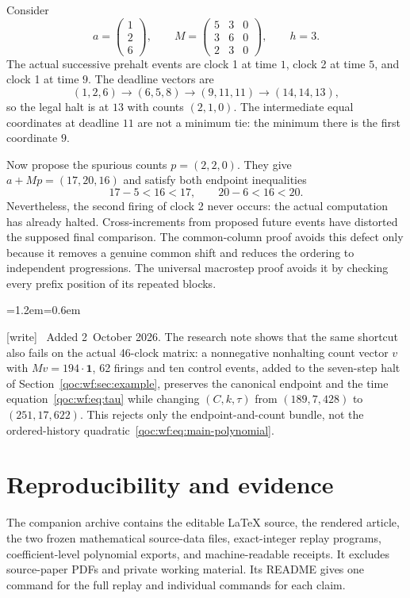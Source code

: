 \documentclass[11pt,letterpaper]{article}
\theoremstyle{definition}
\theoremstyle{remark}
\newcommand{\one}{\mathbf 1}
\newcommand{\wtag}{\textup{[write]}}
\newenvironment{writenote}{\par\smallskip\begin{list}{}{\leftmargin=1.2em\rightmargin=0.6em}\item[]\small\wtag\ }{\end{list}\smallskip}
\begin{document}
Consider
\begin{equation}\label{qoc:wf:eq:counterexample}
 a=\begin{pmatrix}1\\2\\6\end{pmatrix},\qquad
 M=\begin{pmatrix}5&3&0\\3&6&0\\2&3&0\end{pmatrix},\qquad h=3.
\end{equation}
The actual successive prehalt events are clock 1 at time $1$, clock 2 at time $5$, and clock 1 at time $9$. The deadline vectors are
\[
 (1,2,6)\to(6,5,8)\to(9,11,11)\to(14,14,13),
\]
so the legal halt is at $13$ with counts $(2,1,0)$. The intermediate equal coordinates at deadline $11$ are not a minimum tie: the minimum there is the first coordinate $9$.

Now propose the spurious counts $p=(2,2,0)$. They give $a+Mp=(17,20,16)$ and satisfy both endpoint inequalities
\[
 17-5<16<17,\qquad 20-6<16<20.
\]
Nevertheless, the second firing of clock 2 never occurs: the actual computation has already halted. Cross-increments from proposed future events have distorted the supposed final comparison. The common-column proof avoids this defect only because it removes a genuine common shift and reduces the ordering to independent progressions. The universal macrostep proof avoids it by checking every prefix position of its repeated blocks.

\begin{writenote}
Added 2~October 2026. The research note  shows that the same shortcut also fails on the actual 46-clock matrix: a nonnegative nonhalting count vector $v$ with $Mv=194\cdot\one$, 62 firings and ten control events, added to the seven-step halt of Section~\ref{qoc:wf:sec:example}, preserves the canonical endpoint and the time equation~\eqref{qoc:wf:eq:tau} while changing $(C,k,\tau)$ from $(189,7,428)$ to $(251,17,622)$. This rejects only the endpoint-and-count bundle, not the ordered-history quadratic~\eqref{qoc:wf:eq:main-polynomial}.
\end{writenote}

\section{Reproducibility and evidence}\label{qoc:wf:sec:replay}
The companion archive contains the editable LaTeX source, the rendered article, the two frozen mathematical source-data files, exact-integer replay programs, coefficient-level polynomial exports, and machine-readable receipts. It excludes source-paper PDFs and private working material. Its README gives one command for the full replay and individual commands for each claim.
\end{document}
